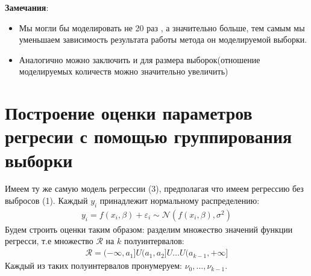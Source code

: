 \documentclass[12pt]{article}
\begin{document}
 \hfill\break
\textbf{Замечания}:
\begin{itemize}
    \item Мы могли бы моделировать не 20 раз , а значительно больше, тем самым мы уменьшаем зависимость результата работы метода он моделируемой выборки.\\
    \item Аналогично можно заключить и для размера выборок(отношение моделируемых количеств можно значительно увеличить)
\end{itemize}
\newpage
\section{Построение оценки параметров регресии с помощью группирования выборки}
Имеем ту же самую модель регрессии (3), предполагая что имеем регрессию без выбросов (1). 
Каждый $y_i$ принадлежит нормальному распределению:
\begin{eqnarray}
    y_i=f(x_i,\beta)+\varepsilon_i \sim \mathcal{N}(f(x_i,\beta),\sigma^2)
\end{eqnarray}
Будем строить оценки таким образом: разделим множество значений функции регресси, т.е множество $\mathcal{R}$ на $k$ полуинтервалов:
\begin{eqnarray}
    \mathcal{R}=(-\infty,a_1]U(a_1,a_2]U\dots U(a_{k-1},+\infty ]
\end{eqnarray}
Каждый из таких полуинтервалов пронумеруем: $\nu_0,\dots,\nu_{k-1}$.
\end{document}
